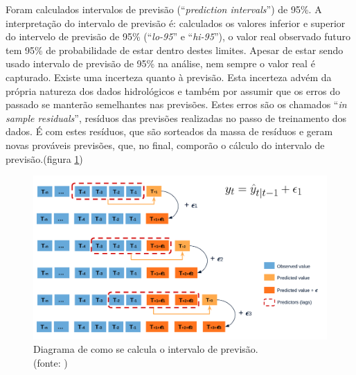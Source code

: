 

Foram calculados intervalos de previsão (``\textit{prediction intervals}'') de 95\%. A interpretação do intervalo de previsão é: calculados os valores inferior e superior do intervelo de previsão de 95\% (``\textit{lo-95}'' e ``\textit{hi-95}''), o valor real observado futuro tem 95\% de probabilidade de estar dentro destes limites.\cite{hyndman_fpp3_2024a} Apesar de estar sendo usado intervalo de previsão de 95\% na análise, nem sempre o valor real é capturado. Existe uma incerteza quanto à previsão. Esta incerteza advém da própria natureza dos dados hidrológicos e também por assumir que os erros do passado se manterão semelhantes nas previsões. Estes erros são os chamados ``\textit{in sample residuals}'', resíduos das previsões realizadas no passo de treinamento dos dados. É com estes resíduos, que são sorteados da massa de resíduos e geram novas prováveis previsões, que, no final, comporão o cálculo do intervalo de previsão.(figura \ref{fig:diagram-bootstrapping-prediction-intervals})

\begin{figure}[!h]
	\centering
	\includegraphics[scale=0.17]{Figuras/diagram-bootstrapping-prediction-intervals.png}
	\caption{Diagrama de como se calcula o intervalo de previsão.\\(fonte: \cite{skforecast_b})}
	\label{fig:diagram-bootstrapping-prediction-intervals}
\end{figure}


